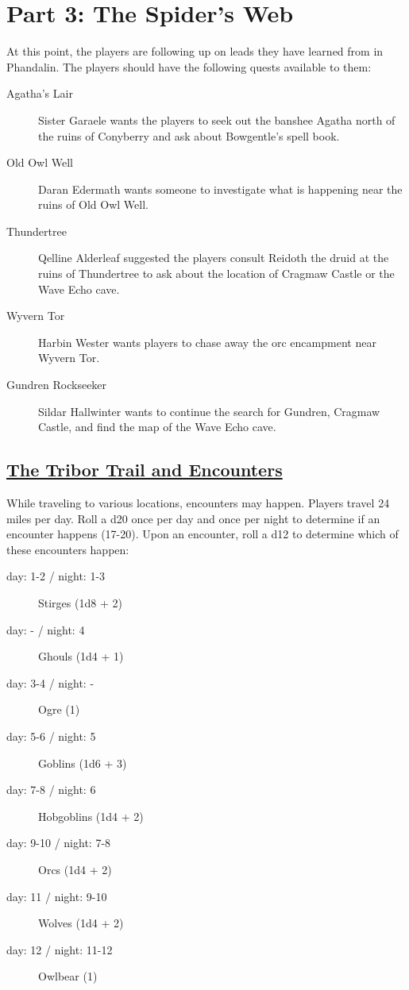 \section{Part 3: The Spider's Web}
At this point, the players are following up on leads they have learned from in Phandalin. The players should have the following quests available to them:

\begin{description}
	\item[Agatha's Lair] Sister Garaele wants the players to seek out the banshee Agatha north of the ruins of Conyberry and ask about Bowgentle's spell book.
	\item[Old Owl Well] Daran Edermath wants someone to investigate what is happening near the ruins of Old Owl Well.
	\item[Thundertree] Qelline Alderleaf suggested the players consult Reidoth the druid at the ruins of Thundertree to ask about the location of Cragmaw Castle or the Wave Echo cave.
	\item[Wyvern Tor] Harbin Wester wants players to chase away the orc encampment near Wyvern Tor.
	\item[Gundren Rockseeker] Sildar Hallwinter wants to continue the search for Gundren, Cragmaw Castle, and find the map of the Wave Echo cave.
\end{description}

\subsection{\underline{The Tribor Trail and Encounters}}
While traveling to various locations, encounters may happen. Players travel 24 miles per day. Roll a d20 once per day and once per night to determine if an encounter happens (17-20). Upon an encounter, roll a d12 to determine which of these encounters happen:

\begin{description}
	\item[day: 1-2 / night: 1-3] Stirges (1d8 + 2)
	\item[day: - / night: 4] Ghouls (1d4 + 1)
	\item[day: 3-4 / night: -] Ogre (1)
	\item[day: 5-6 / night: 5] Goblins (1d6 + 3)
	\item[day: 7-8 / night: 6] Hobgoblins (1d4 + 2)
	\item[day: 9-10 / night: 7-8] Orcs (1d4 + 2)
	\item[day: 11 / night: 9-10] Wolves (1d4 + 2)
	\item[day: 12 / night: 11-12] Owlbear (1)
	
\end{description} 


